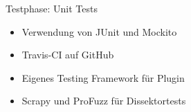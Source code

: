 \begin{frame}{Testphase: Unit Tests}
    \begin{itemize}
        \item Verwendung von JUnit und Mockito
        \item Travis-CI auf GitHub
        \pause
        \item Eigenes Testing Framework für Plugin
        \item Scrapy und ProFuzz für Dissektortests
    \end{itemize}
\end{frame} 